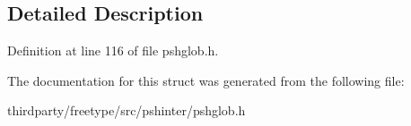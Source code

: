 \subsection{Detailed Description}


Definition at line 116 of file pshglob.\+h.



The documentation for this struct was generated from the following file\+:\begin{DoxyCompactItemize}
\item 
thirdparty/freetype/src/pshinter/pshglob.\+h\end{DoxyCompactItemize}
